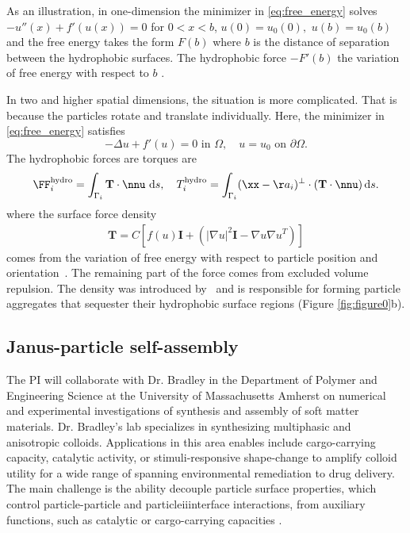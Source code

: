 As an illustration, in one-dimension the minimizer in \eqref{eq:free_energy} 
solves $-u''(x) + f'(u(x)) = 0$ for $0 < x < b$, $u(0) = u_0(0),$ $u(b) = u_0(b)$ 
and the free energy takes the form $F(b)$
where $b$ is the  distance of separation between the hydrophobic surfaces.
The hydrophobic force $-F'(b)$ the variation of free energy with respect to $b$  \cite{ErLjCl89, GoKl94}. 

In two and higher spatial dimensions, the situation is more complicated.
That is because the particles rotate and translate individually.  Here, the 
minimizer  in \eqref{eq:free_energy}  satisfies 
\begin{equation}
\label{eq:SL}
-\Delta u + f'(u) = 0  \text{ in } \Omega,\quad u = u_0  \text{ on } \partial \Omega.
\end{equation}
The hydrophobic forces are torques are
\begin{equation}
  \label{eq:hydrophobicAttraction}
  \FF_i^{\text{hydro}} = \int_{\Gamma_i} {\bf T}\cdot \nnu \, \dif s, 
    \quad 
  T_i^{\text{hydro}} = \int_{\Gamma_i} (\xx - \aa_i)^{\perp} \cdot ({\bf T} \cdot \nnu) \dif s.
\end{equation}
where the surface force density 
\begin{align}
  \label{eq:stress}
\mathbf{T}
= C \left[ f(u) \mathbf{I} +  \left(|\nabla
  u|^2 \mathbf{I} - \nabla u  \nabla u^T\right)\right]
\end{align}
comes from the variation of free energy with respect to particle 
position and orientation~\cite{Bandle2015, Schiffer1954, Grinfeld2010}. 
The remaining part of the force comes from excluded volume repulsion. 
The density \label{eq:stress}  was introduced
by~\cite{Fu20} and is responsible for forming particle aggregates that
sequester their hydrophobic surface regions (Figure \ref{fig:figure0}b).

\subsection{Janus-particle self-assembly} 
The PI will collaborate with Dr. Bradley in the Department of 
Polymer and Engineering Science at the University of Massachusetts Amherst
on numerical and experimental investigations
of synthesis and assembly of soft matter materials.
Dr. Bradley's lab specializes in synthesizing multiphasic and anisotropic colloids.
Applications in this area enables include cargo-carrying capacity, 
catalytic activity, or stimuli-responsive shape-change to amplify colloid utility for a wide 
range of  spanning environmental remediation to drug delivery. 
The main challenge is the ability decouple particle surface properties, 
which control particle-particle and particleiiinterface interactions, 
from auxiliary functions, such as catalytic or cargo-carrying capacities
\cite{}.

